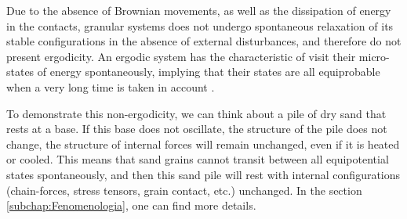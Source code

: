 
    Due to the absence of Brownian movements, as well as the dissipation of energy in the contacts, granular systems does not undergo spontaneous relaxation of its stable configurations in the absence of external disturbances, and therefore do not present ergodicity. An ergodic system has the characteristic of visit their micro-states of energy spontaneously, implying that their states are all equiprobable when a very long time is taken in account \cite{Unifying_Concepts_in_Granular_Media_and_Glasses, Srdjan-Tese}.

    To demonstrate this non-ergodicity, we can think about a pile of dry sand that rests at a base. If this base does not oscillate, the structure of the pile does not change, the structure of internal forces will remain unchanged, even if it is heated or cooled. This means that sand grains cannot transit between all equipotential states spontaneously, and then this sand pile will rest with internal configurations (chain-forces, stress tensors, grain contact, etc.) unchanged. In the section \ref{subchap:Fenomenologia}, one can find more details.


